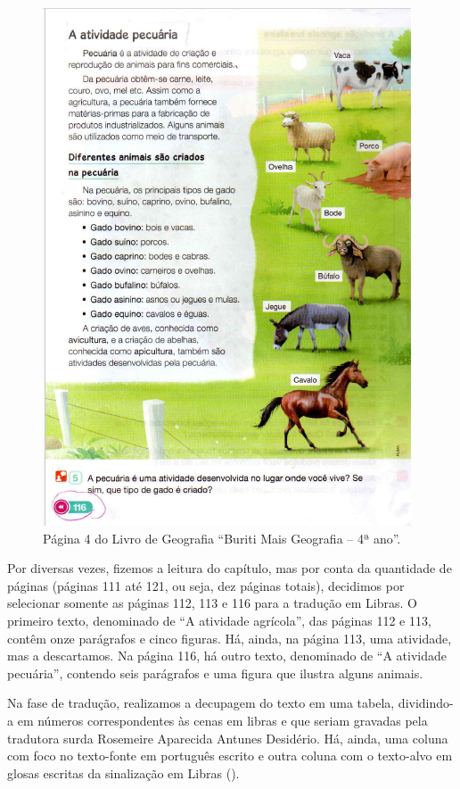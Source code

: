 \documentclass[portuguese]{textolivre}
\begin{document}
\begin{figure}[htbp]
\begin{minipage}{0.45\textwidth}
 \includegraphics[width=\textwidth]{Fig4.png}
 \caption{Página 4 do Livro de Geografia “Buriti Mais Geografia – 4ª ano”.}
 \label{fig4}
 \end{minipage}%
\end{figure}

Por diversas vezes, fizemos a leitura do capítulo, mas por conta da quantidade de páginas (páginas 111 até 121, ou seja, dez páginas totais), decidimos por selecionar somente as páginas 112, 113 e 116 para a tradução em Libras. O primeiro texto, denominado de “A atividade agrícola”, das páginas 112 e 113, contêm onze parágrafos e cinco figuras. Há, ainda, na página 113, uma atividade, mas a descartamos. Na página 116, há outro texto, denominado de “A atividade pecuária”, contendo seis parágrafos e uma figura que ilustra alguns animais.

Na fase de tradução, realizamos a decupagem do texto em uma tabela, dividindo-a em números correspondentes às cenas em libras e que seriam gravadas pela tradutora surda Rosemeire Aparecida Antunes Desidério. Há, ainda, uma coluna com foco no texto-fonte em português escrito e outra coluna com o texto-alvo em glosas escritas da sinalização em Libras (). 
\end{document}
